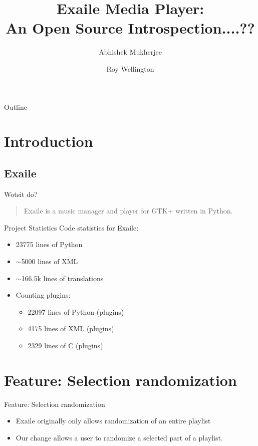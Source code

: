 \documentclass{beamer}
\title
{%
  Exaile Media Player:\\
  An Open Source Introspection....?? %
}
\author
{
  Abhishek Mukherjee \and
  Roy Wellington
}
\begin{document}
\begin{frame}
  \titlepage
\end{frame}

\begin{frame}{Outline}
  \tableofcontents
\end{frame}


\section{Introduction}

\subsection{Exaile}

\begin{frame}{Wotsit do?}
  \begin{quote}
    Exaile is a music manager and player for GTK+ written in Python.
  \end{quote}
\end{frame}

\begin{frame}{Project Statistics}
  Code statistics for Exaile:
  \begin{itemize}
    \item 23775 lines of Python
    \item $\sim$5000 lines of XML
    \item $\sim$166.5k lines of translations
	\item Counting plugins:
	\begin{itemize}
      \item 22097 lines of Python (plugins)
      \item 4175 lines of XML (plugins)
      \item 2329 lines of C (plugins)
	\end{itemize}
  \end{itemize}
\end{frame}

\section{Feature: Selection randomization}

\begin{frame}{Feature: Selection randomization}
  \begin{itemize}
     \item Exaile originally only allows randomization of an entire playlist
     \item Our change allows a user to randomize a selected part of a playlist.
  \end{itemize}
\end{frame}
\end{document}
